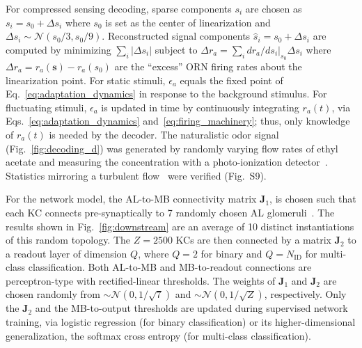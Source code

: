 \documentclass[9pt,twocolumn,twoside]{pnas-new}
\begin{document}
For compressed sensing decoding, sparse components $s_i$ are chosen as $s_i = s_0 + \Delta s_i$ where $s_0$ is set as the center of linearization and $\Delta s_i \sim \mathcal {N} (s_0/3, s_0/9)$. Reconstructed signal components $\hat {s} _i = s_0 + \Delta s_i$ are computed by minimizing $\sum_i |\Delta s_i|$ subject to $\Delta r_a = \sum_i dr_a/ds_i\big|_{s_0}\Delta  s_i$ where $\Delta r_a = r_a(\mathbf s) -  r_a(s_0)$ are the ``excess” ORN firing rates about the linearization point. For static stimuli, $\epsilon_a$ equals the fixed point of Eq.~\ref{eq:adaptation_dynamics} in response to the background stimulus. For fluctuating stimuli, $\epsilon_a$ is updated in time by continuously integrating  $r_a(t)$, via Eqs.~\ref{eq:adaptation_dynamics} and~\ref{eq:firing_machinery}; thus, only knowledge of $r_a(t)$ is needed by the decoder.
The naturalistic odor signal (Fig.~\ref{fig:decoding_d}) was generated by randomly varying flow rates of ethyl acetate and measuring the concentration with a photo-ionization detector~\cite{srinivas_elife}. Statistics mirroring a turbulent flow~\cite{celani} were verified (Fig.~S9).

For the network model, the AL-to-MB connectivity matrix $\mathbf {J}_1$, is chosen such that  each KC connects pre-synaptically to 7 randomly chosen AL glomeruli~\cite{litwinkumar,abbott_axel}. The results shown in Fig.~\ref{fig:downstream} are an average of 10 distinct instantiations of this random topology. The $Z=2500$ KCs are then connected by a matrix $\mathbf J_2$ to a readout layer of dimension $Q$, where $Q=2$ for binary and $Q=N_{\text{ID}}$ for multi-class classification. Both AL-to-MB and MB-to-readout connections are perceptron-type with rectified-linear thresholds. The weights of $\mathbf J_1$ and $\mathbf J_2$ are chosen randomly from $\sim \mathcal{N}(0, 1/\sqrt{7})$ and $\sim \mathcal{N}(0, 1/\sqrt{Z})$, respectively. Only the $\mathbf J_2$ and the MB-to-output thresholds are updated during supervised network training, via logistic regression (for binary classification) or its higher-dimensional generalization, the softmax cross entropy (for multi-class classification).




\showacknow
\end{document}
